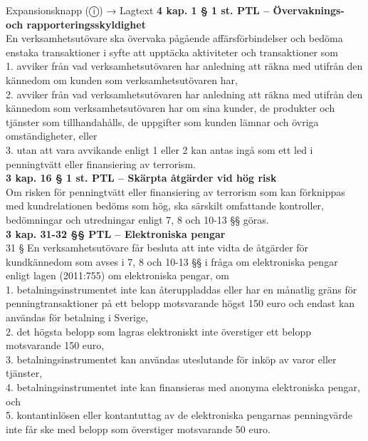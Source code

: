 \documentclass[10pt]{beamer}
\begin{document}
\begin{frame}[label=riskfragor-steg3]
\begin{alertblock}{Expansionsknapp (ⓘ) → Lagtext}
    \tiny \textbf{4 kap. 1 § 1 st. PTL – Övervaknings- och rapporteringsskyldighet}\\
    \tiny En verksamhetsutövare ska övervaka pågående affärsförbindelser och bedöma enstaka transaktioner 
    i syfte att upptäcka aktiviteter och transaktioner som\\
    1. avviker från vad verksamhetsutövaren har anledning att räkna med utifrån den kännedom 
    om kunden som verksamhetsutövaren har,\\
    2. avviker från vad verksamhetsutövaren har anledning att räkna med utifrån den kännedom som 
    verksamhetsutövaren har om sina kunder, de produkter och tjänster som tillhandahålls, 
    de uppgifter som kunden lämnar och övriga omständigheter, eller\\
    3. utan att vara avvikande enligt 1 eller 2 kan antas ingå som ett led i penningtvätt eller 
    finansiering av terrorism.\\[0.1cm]

    \tiny \textbf{3 kap. 16 § 1 st. PTL – Skärpta åtgärder vid hög risk}\\
    \tiny Om risken för penningtvätt eller finansiering av terrorism som kan förknippas med kundrelationen 
    bedöms som hög, ska särskilt omfattande kontroller, bedömningar och utredningar enligt 
    7, 8 och 10-13 §§ göras.\\[0.1cm]
    \tiny \textbf{3 kap. 31-32 §§ PTL – Elektroniska pengar}\\
    \tiny 31 §   En verksamhetsutövare får besluta att inte vidta de åtgärder för kundkännedom som 
    avses i 7, 8 och 10-13 §§ i fråga om elektroniska pengar enligt lagen (2011:755) om elektroniska pengar, 
    om\\
    1. betalningsinstrumentet inte kan återuppladdas eller har en månatlig gräns för penningtransaktioner 
    på ett belopp motsvarande högst 150 euro och endast kan användas för betalning i Sverige,\\
    2. det högsta belopp som lagras elektroniskt inte överstiger ett belopp motsvarande 150 euro,\\ 
    3. betalningsinstrumentet kan användas uteslutande för inköp av varor eller tjänster,\\
    4. betalningsinstrumentet inte kan finansieras med anonyma elektroniska pengar, och\\
    5. kontantinlösen eller kontantuttag av de elektroniska pengarnas penningvärde inte får 
    ske med belopp som överstiger motsvarande 50 euro.\\


\end{alertblock}
\end{frame}
\end{document}
